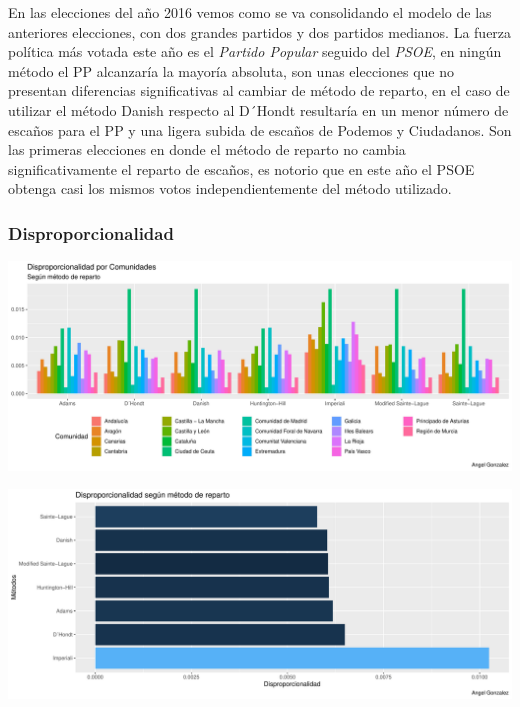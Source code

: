 \documentclass[12pt,a4paper,]{book}
\numberwithin{dummy}{section}
\theoremstyle{ocrenumbox}
\theoremstyle{blacknumex}
\theoremstyle{blacknumbox}
\theoremstyle{ocrenum}
\theoremstyle{ocrenum}
\begin{document}
En las elecciones del año 2016 vemos como se va consolidando el modelo
de las anteriores elecciones, con dos grandes partidos y dos partidos
medianos. La fuerza política más votada este año es el \emph{Partido
Popular} seguido del \emph{PSOE}, en ningún método el PP alcanzaría la
mayoría absoluta, son unas elecciones que no presentan diferencias
significativas al cambiar de método de reparto, en el caso de utilizar
el método Danish respecto al D´Hondt resultaría en un menor número de
escaños para el PP y una ligera subida de escaños de Podemos y
Ciudadanos. Son las primeras elecciones en donde el método de reparto no
cambia significativamente el reparto de escaños, es notorio que en este
año el PSOE obtenga casi los mismos votos independientemente del método
utilizado.

\hypertarget{disproporcionalidad-12}{%
\subsubsection{Disproporcionalidad}\label{disproporcionalidad-12}}

\begin{center}\includegraphics[width=0.95\linewidth]{figurasR/unnamed-chunk-168-1} \end{center}

\begin{center}\includegraphics[width=0.95\linewidth]{figurasR/unnamed-chunk-168-2} \end{center}
\end{document}
